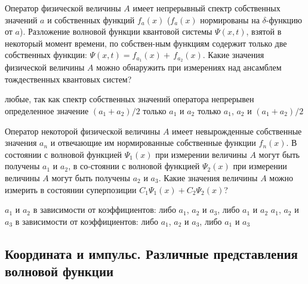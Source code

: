 \documentclass[11pt,a4paper]{exam}
\begin{document}
\begin{questions}
\question Оператор физической величины $A$ имеет непрерывный спектр собственных значений $a$ и собственных функций ${f_a}(x)$ (${f_a}(x)$ нормированы на $\delta $-функцию от $a$). Разложение волновой функции квантовой системы $\Psi (x,t)$, взятой в некоторый момент времени, по собствен-ным функциям содержит только две собственных функции: $\Psi (x,t) = {f_{{a_1}}}(x) + \,{f_{{a_2}}}(x)$. Какие значения физической величины $A$ можно обнаружить при измерениях над ансамблем тождественных квантовых систем?
\begin{choices}
\choice любые, так как спектр собственных значений оператора непрерывен
\choice определенное значение $\left( {{a_1} + {a_2}} \right)/2$
\choice только ${a_1}$ и ${a_2}$
\choice только ${a_1}$, ${a_2}$ и $\left( {{a_1} + {a_2}} \right)/2$
\end{choices}

\question Оператор некоторой физической величины $A$ имеет невырожденные собственные значения ${a_n}$ и отвечающие им нормированные собственные функции ${f_n}(x)$. В состоянии с волновой функцией ${\Psi _1}(x)$ при измерении величины $A$ могут быть получены ${a_1}$ и ${a_2}$, в со-стоянии с волновой функцией ${\Psi _2}(x)$ при измерении величины $A$ могут быть получены ${a_2}$ и ${a_3}$. Какие значения величины $A$ можно измерить в состоянии суперпозиции ${C_1}{\Psi _1}(x) + {C_2}{\Psi _2}(x)$?
\begin{choices}
\choice ${a_1}$ и ${a_2}$        
\choice в зависимости от коэффициентов: либо ${a_1}$, ${a_2}$ и ${a_3}$, либо ${a_1}$ и ${a_2}$
\choice ${a_1}$, ${a_2}$ и ${a_3}$        
\choice в зависимости от коэффициентов: либо ${a_1}$, ${a_2}$ и ${a_3}$, либо ${a_1}$ и ${a_3}$  
\end{choices}

\end{questions}

\subsection{ Координата и импульс. Различные представления волновой функции }
\end{document}
